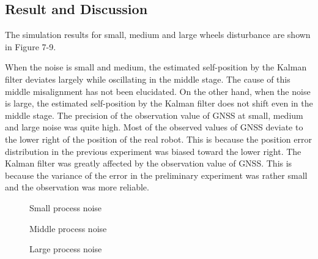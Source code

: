 \documentclass[a4paper]{article}
\begin{document}
\subsection{Result and Discussion}

The simulation results for small, medium and large wheels 
disturbance are shown in Figure 7-9.

When the noise is small and medium, the estimated self-position by the Kalman 
filter deviates largely while oscillating in the middle stage. The cause of 
this middle misalignment has not been elucidated. 
On the other hand, when the noise is large, the estimated self-position 
by the Kalman filter does not shift even in the middle stage. 
The precision of the observation value of GNSS at small, medium and large noise 
was quite high. Most of the observed values ​​of GNSS deviate to the lower right 
of the position of the real robot. This is because the position error distribution 
in the previous experiment was biased toward the lower right. 
The Kalman filter was greatly affected by the observation value of GNSS. 
This is because the variance of the error in the preliminary experiment was 
rather small and the observation was more reliable.

\begin{figure}[H]
\centerline{}
\caption{Small process noise}
\end{figure}
\begin{figure}[H]
\centerline{}
\caption{Middle process noise}
\end{figure}
\begin{figure}[H]
\centerline{}
\caption{Large process noise}
\end{figure}
\end{document}
